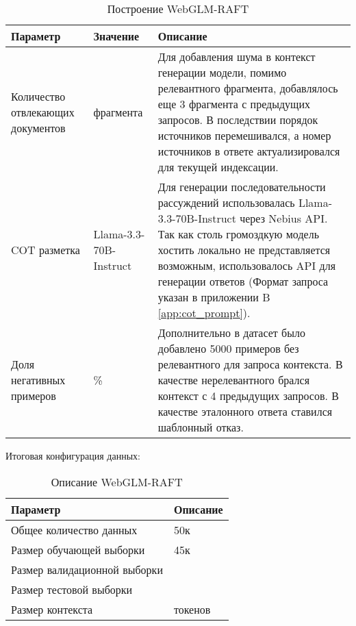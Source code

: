 \begin{table}[H]
\centering
\caption{Построение WebGLM-RAFT}
\fontsize{12}{14}\selectfont
\renewcommand{\arraystretch}{1.0}
\begin{tabularx}{\textwidth}{
  >{\centering\arraybackslash}p{2.5cm} 
  >{\centering\arraybackslash}p{2.5cm} 
  >{\centering\arraybackslash}p{10cm}
}
\toprule
\textbf{Параметр} & \textbf{Значение} & \textbf{Описание} \\
\midrule
Количество отвлекающих документов & 3 фрагмента & Для добавления шума в контекст генерации модели, помимо релевантного фрагмента, добавлялось еще 3 фрагмента с предыдущих запросов. В последствии порядок источников перемешивался, а номер источников в ответе актуализировался для текущей индексации. \\
\midrule
COT разметка & Llama-3.3-70B-Instruct & Для генерации последовательности рассуждений использовалась Llama-3.3-70B-Instruct через Nebius API. Так как столь громоздкую модель хостить локально не представляется возможным, использовалось API для генерации ответов (Формат запроса указан в приложении B \ref{app:cot_prompt}).\\
\midrule
Доля негативных примеров & 10\% & Дополнительно в датасет было добавлено 5000 примеров без релевантного для запроса контекста. В качестве нерелевантного брался контекст с 4 предыдущих запросов. В качестве эталонного ответа ставился шаблонный отказ.\\
\bottomrule
\end{tabularx}
\end{table}

Итоговая конфигурация данных:

\begin{table}[H]
\centering
\caption{Описание WebGLM-RAFT}
\fontsize{12}{14}\selectfont
\renewcommand{\arraystretch}{1.2}
\begin{tabularx}{\textwidth}{
  >{\centering\arraybackslash}p{5cm} 
  >{\centering\arraybackslash}p{10cm}
}
\toprule
\textbf{Параметр} & \textbf{Описание} \\
\midrule
Общее количество данных & 50к \\
\midrule
Размер обучающей выборки & 45к \\
\midrule
Размер валидационной выборки & 3500 \\
\midrule
Размер тестовой выборки & 1500 \\
\midrule
Размер контекста & 4096 токенов \\
\bottomrule
\end{tabularx}
\end{table}

